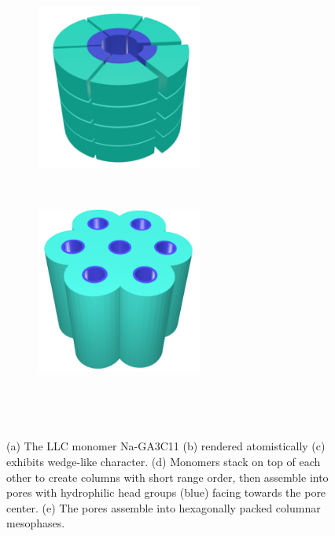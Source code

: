 \documentclass{article}
\begin{document}
\begin{figure}[!htb]
\begin{subfigure}{0.3\linewidth}
              \caption{}~\label{fig:wedge}
      \end{subfigure}
              \begin{subfigure}{0.4\linewidth}
              \centering
              \includegraphics[width=0.6\textwidth]{columns.pdf}
              \caption{}~\label{fig:wedge_layer}
      \end{subfigure}
      \begin{subfigure}{0.4\linewidth}
              \centering
              \includegraphics[width=0.6\textwidth]{hexagonal_packing.pdf}
              \caption{}~\label{fig:hex_packing_simple}
      \end{subfigure}
      \caption{(a) The LLC monomer Na-GA3C11 (b) rendered atomistically (c)
      exhibits wedge-like character. (d) Monomers stack on top of each other to
      create columns with short range order, then assemble into pores with
      hydrophilic head groups (blue) facing towards the pore center. (e) The
      pores assemble into hexagonally packed columnar mesophases.}~\label{fig:assembly}
  \end{figure}
  
\end{document}

